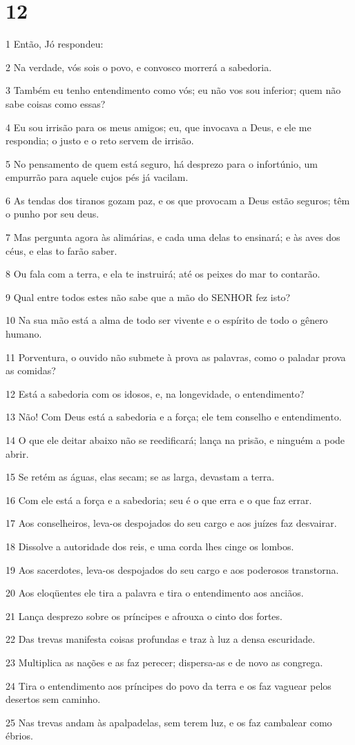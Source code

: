 \chapter{12}

\par 1 Então, Jó respondeu:
\par 2 Na verdade, vós sois o povo, e convosco morrerá a sabedoria.
\par 3 Também eu tenho entendimento como vós; eu não vos sou inferior; quem não sabe coisas como essas?
\par 4 Eu sou irrisão para os meus amigos; eu, que invocava a Deus, e ele me respondia; o justo e o reto servem de irrisão.
\par 5 No pensamento de quem está seguro, há desprezo para o infortúnio, um empurrão para aquele cujos pés já vacilam.
\par 6 As tendas dos tiranos gozam paz, e os que provocam a Deus estão seguros; têm o punho por seu deus.
\par 7 Mas pergunta agora às alimárias, e cada uma delas to ensinará; e às aves dos céus, e elas to farão saber.
\par 8 Ou fala com a terra, e ela te instruirá; até os peixes do mar to contarão.
\par 9 Qual entre todos estes não sabe que a mão do SENHOR fez isto?
\par 10 Na sua mão está a alma de todo ser vivente e o espírito de todo o gênero humano.
\par 11 Porventura, o ouvido não submete à prova as palavras, como o paladar prova as comidas?
\par 12 Está a sabedoria com os idosos, e, na longevidade, o entendimento?
\par 13 Não! Com Deus está a sabedoria e a força; ele tem conselho e entendimento.
\par 14 O que ele deitar abaixo não se reedificará; lança na prisão, e ninguém a pode abrir.
\par 15 Se retém as águas, elas secam; se as larga, devastam a terra.
\par 16 Com ele está a força e a sabedoria; seu é o que erra e o que faz errar.
\par 17 Aos conselheiros, leva-os despojados do seu cargo e aos juízes faz desvairar.
\par 18 Dissolve a autoridade dos reis, e uma corda lhes cinge os lombos.
\par 19 Aos sacerdotes, leva-os despojados do seu cargo e aos poderosos transtorna.
\par 20 Aos eloqüentes ele tira a palavra e tira o entendimento aos anciãos.
\par 21 Lança desprezo sobre os príncipes e afrouxa o cinto dos fortes.
\par 22 Das trevas manifesta coisas profundas e traz à luz a densa escuridade.
\par 23 Multiplica as nações e as faz perecer; dispersa-as e de novo as congrega.
\par 24 Tira o entendimento aos príncipes do povo da terra e os faz vaguear pelos desertos sem caminho.
\par 25 Nas trevas andam às apalpadelas, sem terem luz, e os faz cambalear como ébrios.

